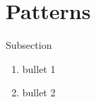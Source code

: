 \section{Patterns}
\begin{frame}{Subsection}
    \begin{enumerate}
           \item bullet 1
    \pause \item bullet 2
    \end{enumerate}
\end{frame}
